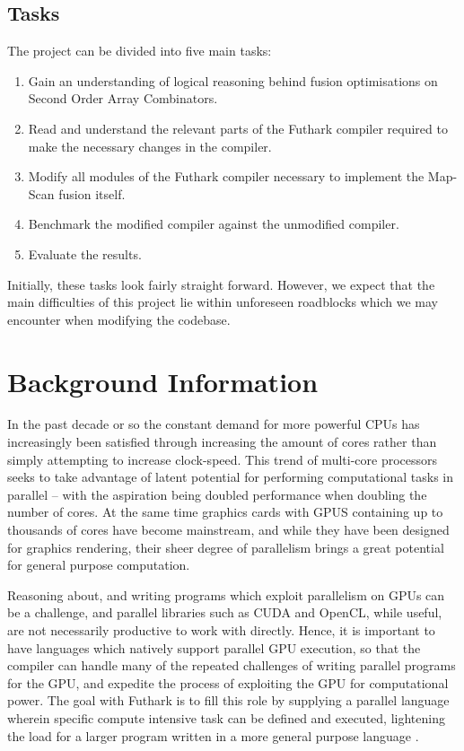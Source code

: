 \documentclass[11pt,bibliography=totocnumbered]{article}
\begin{document}
\subsection{Tasks}
The project can be divided into five main tasks:
\begin{enumerate}
    \item Gain an understanding of logical reasoning behind fusion optimisations on Second Order Array Combinators.
    \item Read and understand the relevant parts of the Futhark compiler required to make the necessary changes in the compiler.
    \item Modify all modules of the Futhark compiler necessary to implement the Map-Scan fusion itself.
    \item Benchmark the modified compiler against the unmodified compiler.
    \item Evaluate the results.
\end{enumerate}
Initially, these tasks look fairly straight forward. However, we expect that the main difficulties of this project lie within unforeseen roadblocks which we may encounter when modifying the codebase.

\section{Background Information}
In the past decade or so the constant demand for more powerful CPUs has increasingly been satisfied through increasing the amount of cores rather than simply attempting to increase clock-speed.
 This trend of multi-core processors seeks to take advantage of latent potential for performing computational tasks in parallel -- with the aspiration being doubled performance when doubling the
 number of cores. At the same time graphics cards with GPUS containing up to thousands of cores have become mainstream, and while they have been designed for graphics rendering, their sheer degree of 
parallelism brings a great potential for general purpose computation. 

Reasoning about, and writing programs which exploit parallelism on GPUs can be a challenge, and parallel libraries such as CUDA and OpenCL, while useful, are not necessarily productive to work with directly.
 Hence, it is important to have languages which natively support parallel GPU execution, so that the compiler can handle many of the repeated challenges of writing parallel programs for the GPU, and 
 expedite the process of exploiting the GPU for computational power. The goal with Futhark is to fill this role by supplying a parallel language wherein specific compute intensive task can be defined and executed,
 lightening the load for a larger program written in a more general purpose language \cite{futharklang}.
\end{document}
